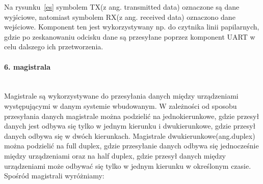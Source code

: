 \documentclass[12p]{article}
\begin{document}
Na rysunku~\ref{es} symbolem TX(z ang. transmitted data) oznaczone są dane wyjściowe, natomiast symbolem RX(z ang. received data) oznaczono dane wejściowe. Komponent ten jest wykorzystywany np. do czytnika linii papilarnych, gdzie po zeskanowaniu odcisku dane są przesyłane poprzez komponent UART w celu dalszego ich przetworzenia.

\paragraph{6. magistrala} \mbox{} \\

Magistrale są wykorzystywane do przesyłania danych między urządzeniami występującymi w danym systemie wbudowanym. W zależności od sposobu przesyłania danych magistrale można podzielić na jednokierunkowe, gdzie przesył danych jest odbywa się tylko w jednym kierunku i dwukierunkowe, gdzie przesył danych odbywa się w dwóch kierunkach. Magistrale dwukierunkowe(ang.duplex) można podzielić na full duplex, gdzie przesyłanie danych odbywa się jednocześnie między urządzeniami oraz na half duplex, gdzie przesył danych między urządzeniami może odbywać się tylko w jednym kierunku w określonym czasie. Spośród magistrali wyróżniamy: 
\end{document}

